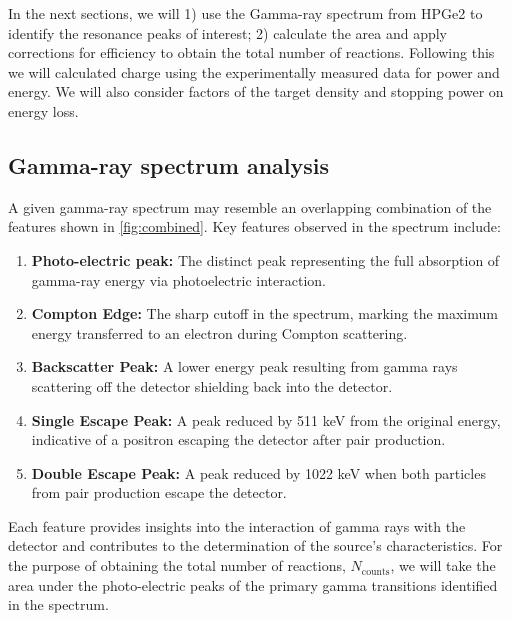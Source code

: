 \documentclass[a4paper,12pt]{article}
\begin{document}
In the next sections, we will 1) use the Gamma-ray spectrum from HPGe2 to identify the resonance peaks of interest; 2) calculate the area and apply corrections for efficiency to obtain the total number of reactions.  Following this we will calculated charge using the experimentally measured data for power and energy.  We will also consider factors of the target density and stopping power on energy loss.

\subsection{Gamma-ray spectrum analysis}

A given gamma-ray spectrum may resemble an overlapping combination of the features shown in \ref{fig:combined}. Key features observed in the spectrum include:

\begin{enumerate}
    \item \textbf{Photo-electric peak:} The distinct peak representing the full absorption of gamma-ray energy via photoelectric interaction.
    \item \textbf{Compton Edge:} The sharp cutoff in the spectrum, marking the maximum energy transferred to an electron during Compton scattering.
    \item \textbf{Backscatter Peak:} A lower energy peak resulting from gamma rays scattering off the detector shielding back into the detector.
    \item \textbf{Single Escape Peak:} A peak reduced by 511 keV from the original energy, indicative of a positron escaping the detector after pair production.
    \item \textbf{Double Escape Peak:} A peak reduced by 1022 keV when both particles from pair production escape the detector.
\end{enumerate}

Each feature provides insights into the interaction of gamma rays with the detector and contributes to the determination of the source's characteristics.  For the purpose of obtaining the total number of reactions, $N_{\text{counts}}$, we will take the area under the photo-electric peaks of the primary gamma transitions identified in the spectrum.
\end{document}
